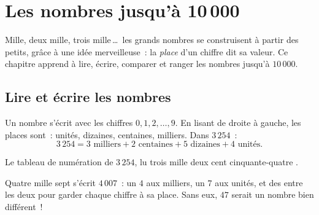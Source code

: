 \chapter{Les nombres jusqu'à 10\,000}\label{ch:g3:numbers}

Mille, deux mille, trois mille\,\dots\ les grands nombres se
construisent à partir des petits, grâce à une idée
merveilleuse~: la \emph{place} d'un chiffre dit sa valeur. Ce chapitre
apprend à lire, écrire, comparer et ranger les nombres jusqu'à
$10\,000$.

\section{Lire et écrire les nombres}

\begin{definition}\label{def:g3:numbers:place}
Un nombre s'écrit avec les chiffres $0, 1, 2, \dots, 9$. En lisant
de droite à gauche, les places sont~: unités, dizaines, centaines,
milliers. Dans $3\,254$~:
\[
3\,254 = 3 \text{ milliers} + 2 \text{ centaines} + 5 \text{ dizaines}
+ 4 \text{ unités}.
\]
\end{definition}

\begin{omfigure}

{\small Le tableau de numération de $3\,254$, lu
\guillemotleft{} trois mille deux cent cinquante-quatre
\guillemotright{}.}
\end{omfigure}

\begin{example}\label{ex:g3:numbers:zero}
\guillemotleft{} Quatre mille sept \guillemotright{} s'écrit
$4\,007$~: un $4$ aux milliers, un $7$ aux unités, et des
\emph{} entre les deux pour garder chaque chiffre à sa
place. Sans eux, $47$ serait un nombre bien différent~!
\end{example}

